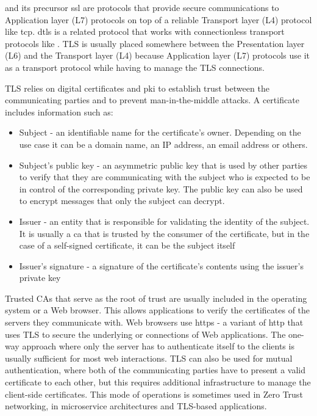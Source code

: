  \autocite{tlsRFC} and its precursor \gls{ssl} are protocols
that provide secure communications to Application layer (L7) protocols
on top of a reliable Transport layer (L4) protocol like \gls{tcp}.
\gls{dtls} is a related protocol that works with connectionless
transport protocols like . TLS is usually placed somewhere
between the Presentation layer (L6) and the Transport layer (L4) because
Application layer (L7) protocols use it as a transport protocol while
having to manage the TLS connections.

TLS relies on digital certificates and \gls{pki} to establish trust
between the communicating parties and to prevent man-in-the-middle
attacks. A certificate includes information such as:

\begin{itemize}
\tightlist
\item
  Subject - an identifiable name for the certificate's owner. Depending
  on the use case it can be a domain name, an IP address, an email
  address or others.
\item
  Subject's public key - an asymmetric public key that is used by other
  parties to verify that they are communicating with the subject who is
  expected to be in control of the corresponding private key. The public
  key can also be used to encrypt messages that only the subject can
  decrypt.
\item
  Issuer - an entity that is responsible for validating the identity of
  the subject. It is usually a \gls{ca} that is trusted by the consumer
  of the certificate, but in the case of a self-signed certificate, it
  can be the subject itself
\item
  Issuer's signature - a signature of the certificate's contents using
  the issuer's private key
\end{itemize}

Trusted CAs that serve as the root of trust are usually included in the
operating system or a Web browser. This allows applications to verify
the certificates of the servers they communicate with. Web browsers use
\gls{https} \autocite{httpsRFC} - a variant of \gls{http} that uses TLS
to secure the underlying  or  connections of Web
applications. The one-way approach where only the server has to
authenticate itself to the clients is usually sufficient for most web
interactions. TLS can also be used for mutual authentication, where both
of the communicating parties have to present a valid certificate to each
other, but this requires additional infrastructure to manage the
client-side certificates. This mode of operations is sometimes used in
Zero Trust networking, in microservice architectures and TLS-based
 applications.

